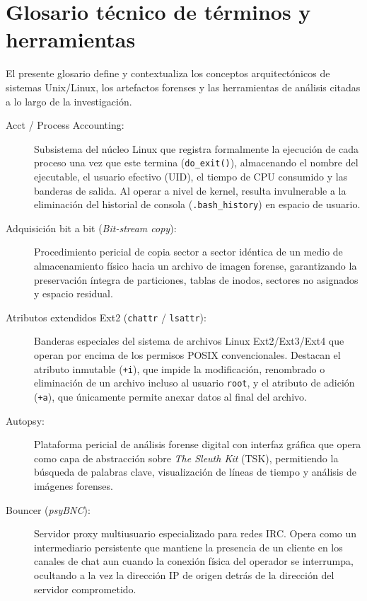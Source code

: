 \chapter{Glosario técnico de términos y herramientas}
\label{apendice:glosario}

El presente glosario define y contextualiza los conceptos arquitectónicos de sistemas Unix/Linux, los artefactos forenses y las herramientas de análisis citadas a lo largo de la investigación.

\begin{description}
    \item[Acct / Process Accounting:] Subsistema del núcleo Linux que registra formalmente la ejecución de cada proceso una vez que este termina (\texttt{do\_exit()}), almacenando el nombre del ejecutable, el usuario efectivo (UID), el tiempo de CPU consumido y las banderas de salida. Al operar a nivel de kernel, resulta invulnerable a la eliminación del historial de consola (\texttt{.bash\_history}) en espacio de usuario.

    \item[Adquisición bit a bit (\textit{Bit-stream copy}):] Procedimiento pericial de copia sector a sector idéntica de un medio de almacenamiento físico hacia un archivo de imagen forense, garantizando la preservación íntegra de particiones, tablas de inodos, sectores no asignados y espacio residual.

    \item[Atributos extendidos Ext2 (\texttt{chattr} / \texttt{lsattr}):] Banderas especiales del sistema de archivos Linux Ext2/Ext3/Ext4 que operan por encima de los permisos POSIX convencionales. Destacan el atributo inmutable (\texttt{+i}), que impide la modificación, renombrado o eliminación de un archivo incluso al usuario \texttt{root}, y el atributo de adición (\texttt{+a}), que únicamente permite anexar datos al final del archivo.

    \item[Autopsy:] Plataforma pericial de análisis forense digital con interfaz gráfica que opera como capa de abstracción sobre \textit{The Sleuth Kit} (TSK), permitiendo la búsqueda de palabras clave, visualización de líneas de tiempo y análisis de imágenes forenses.

    \item[Bouncer (\textit{psyBNC}):] Servidor proxy multiusuario especializado para redes IRC. Opera como un intermediario persistente que mantiene la presencia de un cliente en los canales de chat aun cuando la conexión física del operador se interrumpa, ocultando a la vez la dirección IP de origen detrás de la dirección del servidor comprometido.


\end{description}
